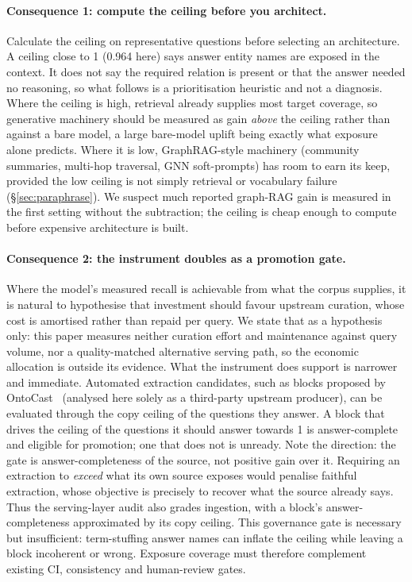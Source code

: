 \documentclass[10pt,twocolumn]{article}
\begin{document}
\paragraph{Consequence 1: compute the ceiling before you architect.}
Calculate the ceiling on representative questions before selecting an architecture. A ceiling close to 1 (0.964 here) says answer entity names are exposed in the context. It does not say the required relation is present or that the answer needed no reasoning, so what follows is a prioritisation heuristic and not a diagnosis. Where the ceiling is high, retrieval already supplies most target coverage, so generative machinery should be measured as gain \emph{above} the ceiling rather than against a bare model, a large bare-model uplift being exactly what exposure alone predicts. Where it is low, GraphRAG-style machinery (community summaries, multi-hop traversal, GNN soft-prompts) has room to earn its keep, provided the low ceiling is not simply retrieval or vocabulary failure (\S\ref{sec:paraphrase}). We suspect much reported graph-RAG gain is measured in the first setting without the subtraction; the ceiling is cheap enough to compute before expensive architecture is built.

\paragraph{Consequence 2: the instrument doubles as a promotion gate.} Where the model's measured recall is achievable from what the corpus supplies, it is natural to hypothesise that investment should favour upstream curation, whose cost is amortised rather than repaid per query. We state that as a hypothesis only: this paper measures neither curation effort and maintenance against query volume, nor a quality-matched alternative serving path, so the economic allocation is outside its evidence. What the instrument does support is narrower and immediate. Automated extraction candidates, such as blocks proposed by OntoCast~\cite{ontocast} (analysed here solely as a third-party upstream producer), can be evaluated through the copy ceiling of the questions they answer. A block that drives the ceiling of the questions it should answer towards 1 is answer-complete and eligible for promotion; one that does not is unready. Note the direction: the gate is answer-completeness of the source, not positive gain over it. Requiring an extraction to \emph{exceed} what its own source exposes would penalise faithful extraction, whose objective is precisely to recover what the source already says. Thus the serving-layer audit also grades ingestion, with a block's answer-completeness approximated by its copy ceiling. This governance gate is necessary but insufficient: term-stuffing answer names can inflate the ceiling while leaving a block incoherent or wrong. Exposure coverage must therefore complement existing CI, consistency and human-review gates.
\end{document}
